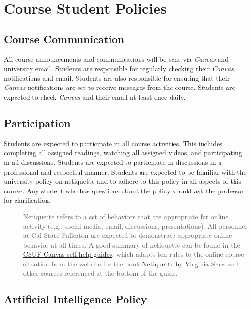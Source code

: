 \documentclass[11pt, letterpaper]{article}
\begin{document}
\section*{Course Student Policies}

\subsection*{Course Communication}
All course announcements and communications will be sent via \emph{Canvas} and university email. Students are responsible for regularly checking their \emph{Canvas} notifications and email. Students are also responsible for ensuring that their \emph{Canvas} notifications are set to receive messages from the course. Students are expected to check \emph{Canvas} and their email at least once daily.

\subsection*{Participation}

Students are expected to participate in all course activities. This includes completing all assigned readings, watching all assigned videos, and participating in all discussions. Students are expected to participate in discussions in a professional and respectful manner. Students are expected to be familiar with the university policy on netiquette and to adhere to this policy in all aspects of this course. Any student who has questions about the policy should ask the professor for clarification. 

\begin{quote}Netiquette refers to a set of behaviors that are appropriate for online activity (e.g., social media, email, discussions, presentations). All personnel at Cal State Fullerton are expected to demonstrate appropriate online behavior at all times. A good summary of netiquette can be found in the \href{https://canvashelp.fullerton.edu/m/Student/l/1336786-student-what-is-netiquette}{CSUF Canvas self-help guides}, which adapts ten rules to the online course situation from the website for the book \href{http://www.albion.com/netiquette/corerules.html}{Netiquette by Virginia Shea} and other sources referenced at the bottom of the guide.\end{quote}


\subsection*{Artificial Intelligence Policy}
\end{document}
